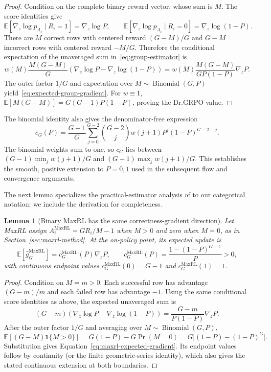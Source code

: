 \documentclass{article}
\newcommand{\1}{\mathbf 1}
\newcommand{\E}{\mathbb E}
\newtheorem{lemma}{Lemma}[section]
\theoremstyle{remark}
\theoremstyle{definition}
\theoremstyle{plain}
\begin{document}
\begin{proof}
Condition on the complete binary reward vector, whose sum is $M$. The score
identities give
\[
  \E[\nabla_z\log p_{A_i}\mid R_i=1]=\nabla_z\log P,
  \qquad
  \E[\nabla_z\log p_{A_i}\mid R_i=0]
  =\nabla_z\log(1-P).
\]
There are $M$ correct rows with centered reward $(G-M)/G$ and $G-M$
incorrect rows with centered reward $-M/G$. Therefore the conditional
expectation of the unaveraged sum in~\eqref{eq:group-estimator} is
\[
  w(M)\frac{M(G-M)}{G}
  \left(\nabla_z\log P-\nabla_z\log(1-P)\right)
  =w(M)\frac{M(G-M)}{GP(1-P)}\nabla_zP.
\]
The outer factor $1/G$ and expectation over
$M\sim\operatorname{Binomial}(G,P)$ yield~\eqref{eq:expected-group-gradient}.
For $w\equiv1$,
$\E[M(G-M)]=G(G-1)P(1-P)$, proving the Dr.GRPO value.
\end{proof}

The binomial identity also gives the denominator-free expression
\[
 c_G(P)=\frac{G-1}{G}\sum_{j=0}^{G-2}\binom{G-2}{j}
 w(j+1)P^j(1-P)^{G-2-j}.
\]
The binomial weights sum to one, so $c_G$ lies between
$(G-1)\min_j w(j+1)/G$ and $(G-1)\max_j w(j+1)/G$.
This establishes the smooth, positive extension to $P=0,1$ used in the
subsequent flow and convergence arguments.

The next lemma specializes the practical-estimator analysis of
\citet[Section~4.3 and Appendix~D, Theorem~5]{tajwar2026maxrl}
to our categorical notation; we include the derivation for completeness.

\begin{lemma}[Binary MaxRL has the same correctness-gradient direction]
\label{lem:maxrl-mean}
Let MaxRL assign
$A_i^{\mathrm{MaxRL}}=GR_i/M-1$ when $M>0$ and zero when $M=0$, as in
Section~\ref{sec:maxrl-method}. At the on-policy point, its expected update is
\begin{equation}
  \E[\widehat g_G^{\mathrm{MaxRL}}]
  =c_G^{\mathrm{MaxRL}}(P)\nabla_zP,
  \qquad
  c_G^{\mathrm{MaxRL}}(P)
  =\frac{1-(1-P)^{G-1}}{P}>0,
  \label{eq:maxrl-expected-gradient}
\end{equation}
with continuous endpoint values
$c_G^{\mathrm{MaxRL}}(0)=G-1$ and
$c_G^{\mathrm{MaxRL}}(1)=1$.
\end{lemma}

\begin{proof}
Condition on $M=m>0$. Each successful row has advantage $(G-m)/m$ and each
failed row has advantage $-1$. Using the same conditional score identities as
above, the expected unaveraged sum is
\[
  (G-m)\!\left(\nabla_z\log P-\nabla_z\log(1-P)\right)
  =\frac{G-m}{P(1-P)}\nabla_zP.
\]
After the outer factor $1/G$ and averaging over
$M\sim\operatorname{Binomial}(G,P)$,
\[
 \E[(G-M)\1\{M>0\}]
 =G(1-P)-G\Pr(M=0)
 =G\big[(1-P)-(1-P)^G\big].
\]
Substitution gives Equation~\eqref{eq:maxrl-expected-gradient}. Its endpoint
values follow by continuity (or the finite geometric-series identity), which
also gives the stated continuous extension at both boundaries.
\end{proof}
\end{document}
